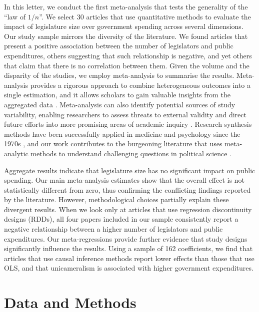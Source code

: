 \documentclass[11pt,a4paper,]{article}
\begin{document}
In this letter, we conduct the first meta-analysis that tests the
generality of the ``law of \(1/n\)''. We select 30 articles that use
quantitative methods to evaluate the impact of legislature size over
government spending across several dimensions. Our study sample mirrors
the diversity of the literature. We found articles that present a
positive association between the number of legislators and public
expenditures, others suggesting that such relationship is negative, and
yet others that claim that there is no correlation between them. Given
the volume and the disparity of the studies, we employ meta-analysis to
summarise the results. Meta-analysis provides a rigorous approach to
combine heterogeneous outcomes into a single estimation, and it allows
scholars to gain valuable insights from the aggregated data
\citep{cooper2019handbook, hedges1985statistical}. Meta-analysis can
also identify potential sources of study variability, enabling
researchers to assess threats to external validity and direct future
efforts into more promising areas of academic inquiry
\citep{doucouliagos2008democracy}. Research synthesis methods have been
successfully applied in medicine and psychology since the 1970s
\citep{glass2015meta}, and our work contributes to the burgeoning
literature that uses meta-analytic methods to understand challenging
questions in political science
\citep{costa2017responsive, doucouliagos2008democracy, green2013field, lau2007effects, schwarz2020supporting}.

Aggregate results indicate that legislature size has no significant
impact on public spending. Our main meta-analysis estimates show that
the overall effect is not statistically different from zero, thus
confirming the conflicting findings reported by the literature. However,
methodological choices partially explain these divergent results. When
we look only at articles that use regression discontinuity designs
(RDDs), all four papers included in our sample consistently report a
negative relationship between a higher number of legislators and public
expenditures. Our meta-regressions provide further evidence that study
designs significantly influence the results. Using a sample of 162
coefficients, we find that articles that use causal inference methods
report lower effects than those that use OLS, and that unicameralism is
associated with higher government expenditures.

\hypertarget{data-and-methods}{%
\section{Data and Methods}\label{data-and-methods}}
\end{document}
